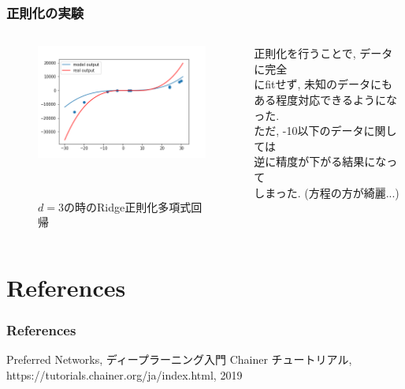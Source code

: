 \documentclass[dvipdfmx,11pt]{beamer}		%
\begin{document}
    \begin{frame}
        \frametitle{正則化の実験}
        \begin{columns}[t]
            \begin{column}{0.65\textwidth} 
                \begin{figure}
                    \centering
                    \includegraphics[width = 6.8cm]{Image/regulared.png}
                    \caption{$d = 3$の時のRidge正則化多項式回帰}
              　\end{figure}
            \end{column}
            \begin{column}{0.75\textwidth}
                正則化を行うことで, データに完全\\
                にfitせず, 未知のデータにも\\
                ある程度対応できるようになった. \\
                ただ, -10以下のデータに関しては\\
                逆に精度が下がる結果になって\\
                しまった. (方程の方が綺麗...)
            \end{column}
        \end{columns}
    \end{frame}
    \section{References}
%
    \begin{frame}\frametitle{References}
	    \begin{thebibliography}{9}
	    \beamertemplatetextbibitems
		     Preferred Networks, ディープラーニング入門 Chainer チュートリアル,
            https://tutorials.chainer.org/ja/index.html, 2019
	    \end{thebibliography}
    \end{frame}
\end{document}
